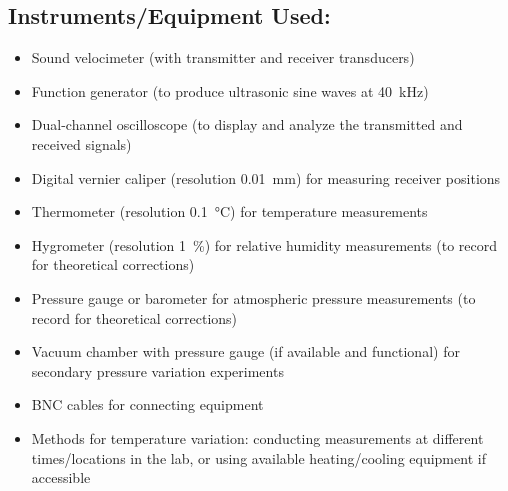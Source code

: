 \documentclass[12pt]{article}
\begin{document}
\subsection*{Instruments/Equipment Used:}
\begin{itemize}
    \item Sound velocimeter (with transmitter and receiver transducers)
    \item Function generator (to produce ultrasonic sine waves at \SI{40}{\kilo\hertz})
    \item Dual-channel oscilloscope (to display and analyze the transmitted and received signals)
    \item Digital vernier caliper (resolution \SI{0.01}{\milli\meter}) for measuring receiver positions
    \item Thermometer (resolution \SI{0.1}{\celsius}) for temperature measurements
    \item Hygrometer (resolution \SI{1}{\percent}) for relative humidity measurements (to record for theoretical corrections)
    \item Pressure gauge or barometer for atmospheric pressure measurements (to record for theoretical corrections)
    \item Vacuum chamber with pressure gauge (if available and functional) for secondary pressure variation experiments
    \item BNC cables for connecting equipment
    \item Methods for temperature variation: conducting measurements at different times/locations in the lab, or using available heating/cooling equipment if accessible
\end{itemize}
\end{document}
